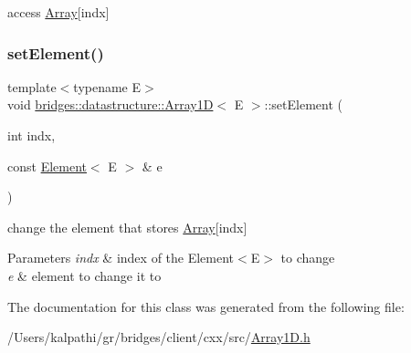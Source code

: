 access \mbox{\hyperlink{classbridges_1_1datastructure_1_1_array}{Array}}\mbox{[}indx\mbox{]} 

\mbox{\label{classbridges_1_1datastructure_1_1_array1_d_a1494c33b1f37bc4c9bc983f1f181488f}} 
\subsubsection{\texorpdfstring{set\+Element()}{setElement()}}
{\footnotesize\ttfamily template$<$typename E$>$ \\
void \mbox{\hyperlink{classbridges_1_1datastructure_1_1_array1_d}{bridges\+::datastructure\+::\+Array1D}}$<$ E $>$\+::set\+Element (\begin{DoxyParamCaption}\item[{int}]{indx,  }\item[{const \mbox{\hyperlink{classbridges_1_1datastructure_1_1_element}{Element}}$<$ E $>$ \&}]{e }\end{DoxyParamCaption})\hspace{0.3cm}{\ttfamily [inline]}}



change the element that stores \mbox{\hyperlink{classbridges_1_1datastructure_1_1_array}{Array}}\mbox{[}indx\mbox{]} 


\begin{DoxyParams}{Parameters}
{\em indx} & index of the Element$<$\+E$>$ to change \\
\hline
{\em e} & element to change it to \\
\hline
\end{DoxyParams}


The documentation for this class was generated from the following file\+:\begin{DoxyCompactItemize}
\item 
/\+Users/kalpathi/gr/bridges/client/cxx/src/\mbox{\hyperlink{_array1_d_8h}{Array1\+D.\+h}}\end{DoxyCompactItemize}
